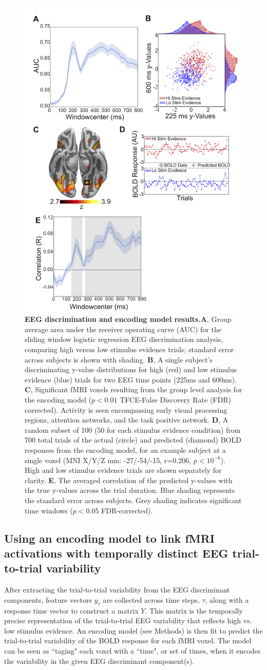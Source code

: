 \begin{figure}[h!]
\centering
\includegraphics[width=.4\textwidth]{Fig4.png}

\caption{\textbf{EEG discrimination and encoding model results.}\textbf{A}, Group average area under the receiver operating curve (AUC) for the sliding window logistic regression EEG discrimination analysis, comparing high versus low stimulus evidence trials; standard error across subjects is shown with shading. \textbf{B}, A single subject's discriminating y-value distributions for high (red) and low stimulus evidence (blue) trials for two EEG time points (225ms and 600ms). \textbf{C}, Significant fMRI voxels resulting from the group level analysis for the encoding model ($p< 0.01$ TFCE-False Discovery Rate (FDR) corrected). Activity is seen encompassing early visual processing regions, attention networks, and the task positive network. \textbf{D}, A random subset of 100 (50 for each stimulus evidence condition) from 700 total trials of the actual (circle) and predicted (diamond) BOLD responses from the encoding model, for an example subject at a single voxel (MNI X/Y/Z mm: -27/-54/-15, r=0.206, $p<10^{-6}$). High and low stimulus evidence trials are shown separately for clarity. \textbf{E}, The averaged correlation of the predicted y-values with the true y-values across the trial duration. Blue shading represents the standard error across subjects. Grey shading indicates significant time windows ($p< 0.05$ FDR-corrected).}
\label{fig:EEGResults}
\end{figure}

\subsection*{Using an encoding model to link fMRI activations with temporally distinct EEG trial-to-trial variability}
After extracting the trial-to-trial variability from the EEG discriminant components, feature vectors $y_{\tau}$ are collected across time steps, $\tau$, along with a response time vector to construct a matrix $Y$. This matrix is the temporally precise representation of the trial-to-trial EEG variability that reflects high vs. low stimulus evidence. An encoding model (see Methods) is then fit to predict the trial-to-trial variability of the BOLD response for each fMRI voxel. The model can be seen as  ``taging" each voxel with a ``time", or set of times, when it encodes the variability in the given EEG discriminant component(s).

